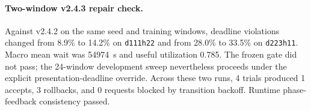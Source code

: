\paragraph{Two-window v2.4.3 repair check.}
Against v2.4.2 on the same seed and training windows, deadline violations changed from
8.9\% to 14.2\% on \texttt{d111h22} and from 28.0\% to
33.5\% on \texttt{d223h11}. Macro mean wait was
54974~s and useful utilization 0.785.
The frozen gate did not pass; the 24-window development sweep
nevertheless proceeds under the explicit presentation-deadline override. Across these two runs,
4 trials produced 1 accepts, 3 rollbacks, and
0 requests blocked by transition backoff. Runtime phase-feedback consistency
passed.
